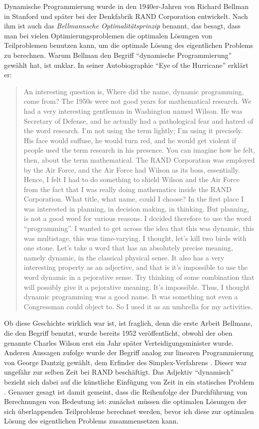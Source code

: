 Dynamische Programmierung wurde in den 1940er-Jahren von Richard Bellman in Stanford und später bei der Denkfabrik RAND Corporation entwickelt. Nach ihm ist auch das \emph{Bellmannsche Optimalitätsprinzip} benannt, das besagt, dass man bei vielen Optimierungsproblemen die optimalen Lösungen von Teilproblemen benutzen kann, um die optimale Lösung des eigentlichen Problems zu berechnen. Warum Bellman den Begriff \enquote{dynamische Programmierung} gewählt hat, ist unklar. In seiner Autobiographie \enquote{Eye of the Hurricane} erklärt er\cite[S.159]{b84}:

\begin{quotation}
	An interesting question is, Where did the name, dynamic programming, come from? The 1950s were not good years for mathematical research. We had a very interesting gentleman in Washington named Wilson. He was Secretary of Defense, and he actually had a pathological fear and hatred of the word research. I’m not using the term lightly; I’m using it precisely. His face would suffuse, he would turn red, and he would get violent if people used the term research in his presence. You can imagine how he felt, then, about the term mathematical. The RAND Corporation was employed by the Air Force, and the Air Force had Wilson as its boss, essentially. Hence, I felt I had to do something to shield Wilson and the Air Force from the fact that I was really doing mathematics inside the RAND Corporation. What title, what name, could I choose? In the first place I was interested in planning, in decision making, in thinking. But planning, is not a good word for various reasons. I decided therefore to use the word “programming”. I wanted to get across the idea that this was dynamic, this was multistage, this was time-varying. I thought, let's kill two birds with one stone. Let's take a word that has an absolutely precise meaning, namely dynamic, in the classical physical sense. It also has a very interesting property as an adjective, and that is it's impossible to use the word dynamic in a pejorative sense. Try thinking of some combination that will possibly give it a pejorative meaning. It's impossible. Thus, I thought dynamic programming was a good name. It was something not even a Congressman could object to. So I used it as an umbrella for my activities.
\end{quotation}

Ob diese Geschichte wirklich war ist, ist fraglich, denn die erste Arbeit Bellmans, die den Begriff benutzt, wurde bereits 1952 veröffentlicht, obwohl der oben genannte Charles Wilson erst ein Jahr später Verteidigungsminister wurde. Anderen Aussagen zufolge wurde der Begriff analog zur linearen Programmierung von George Dantzig gewählt, dem Erfinder des Simplex-Verfahrens \cite{k04}. Dieser war ungefähr zur selben Zeit bei RAND beschäftigt. Das Adjektiv \enquote{dynamisch} bezieht sich dabei auf die künstliche Einfügung von Zeit in ein statisches Problem \cite[S. xi]{b57}. Genauer gesagt ist damit gemeint, dass die Reihenfolge der Durchführung von Berechnungen von Bedeutung ist: zunächst müssen die optimalen Lösungen der sich überlappenden Teilprobleme berechnet werden, bevor ich diese zur optimalen Lösung des eigentlichen Problems zusammensetzen kann.

